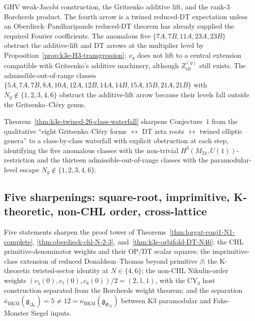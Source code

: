 \begin{theorem}
GHV weak-Jacobi construction, the Gritsenko additive lift, and the
rank-$3$ Borcherds product. The fourth arrow is a twined reduced-DT
expectation unless an Oberdieck--Pandharipande reduced-DT theorem has
already supplied the required Fourier coefficients. The anomalous five
\(\{7A, 7B, 11A, 23A, 23B\}\) obstruct the additive-lift and DT arrows
at the multiplier level by Proposition~\ref{prop:k3e-H3-transgression}:
\(\nu_g\) does not lift to a central extension compatible with
Gritsenko's additive machinery, although \(Z^{(g)}_{\mathrm{ell}}\)
still exists. The admissible-out-of-range classes
\(\{5A, 7A, 7B, 8A, 10A, 12A, 12B, 14A, 14B, 15A, 15B, 21A, 21B\}\)
with \(N_g \notin \{1,2,3,4,6\}\) obstruct the additive-lift arrow
because their levels fall outside the Gritsenko--Cl\'ery genus.
\end{theorem}

\begin{remark}
\label{rem:k3e-conj1-sharpening}
Theorem~\ref{thm:k3e-twined-26-class-waterfall} sharpens Conjecture~$1$ from the qualitative ``eight Gritsenko--Cl\'ery forms $\leftrightarrow$ DT zeta roots $\leftrightarrow$ twined elliptic genera'' to a class-by-class waterfall with explicit obstruction at each step, identifying the five anomalous classes with the non-trivial $H^3(M_{24}, U(1))$-restriction and the thirteen admissible-out-of-range classes with the paramodular-level escape $N_g \notin \{1, 2, 3, 4, 6\}$.
\end{remark}

\subsection{Five sharpenings: square-root, imprimitive, K-theoretic, non-CHL order, cross-lattice}
\label{subsec:k3e-lorgat-conj1-five-closures}

Five statements sharpen the proof tower of Theorems~\ref{thm:lorgat-conj1-N1-complete}, \ref{thm:oberdieck-chl-N-2-3}, and~\ref{thm:k3e-orbifold-DT-N46}: the CHL primitive-denominator weights and their OP/DT scalar squares; the imprimitive-class extension of reduced Donaldson--Thomas beyond primitive $\beta$; the K-theoretic twisted-sector identity at $N \in \{4, 6\}$; the non-CHL Nikulin-order weights $(c_5(0), c_7(0), c_8(0))/2 = (2, 1, 1)$, with the CY$_3$ host construction separated from the Borcherds weight theorem; and the separation $\kappa_{\mathrm{BKM}}(\mathfrak{g}_{\Delta_5}) = 5 \neq 12 = \kappa_{\mathrm{BKM}}(\mathfrak{g}_{\Phi_{12}})$ between K3 paramodular and Fake-Monster Siegel inputs.

